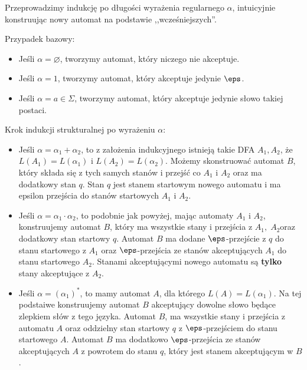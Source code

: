     Przeprowadzimy indukcję po długości wyrażenia regularnego \(\alpha\), intuicyjnie konstruując nowy automat na podstawie ,,wcześniejszych''.
    
    Przypadek bazowy:
    \begin{itemize}
        \item Jeśli \( \alpha = \varnothing \), tworzymy automat, który niczego nie akceptuje.
        \item Jeśli \( \alpha = 1 \), tworzymy automat, który akceptuje jedynie \(\eps\).
        \item Jeśli \( \alpha = a \in \Sigma \), tworzymy automat, który akceptuje jedynie słowo takiej postaci.
    \end{itemize}
    
    Krok indukcji strukturalnej po wyrażeniu \(\alpha\): 
    \begin{itemize}
        \item Jeśli \( \alpha = \alpha_1 + \alpha_2 \), to z założenia indukcyjnego istnieją takie DFA \(A_1, A_2\), że \(L(A_1) = L(\alpha_1)\) i \(L(A_2) = L(\alpha_2)\).
        Możemy skonstruować automat \(B\), który składa się z tych samych stanów i przejść co \(A_1\) i \(A_2\) oraz ma dodatkowy stan \(q\).
        Stan \(q\) jest stanem startowym nowego automatu i ma epsilon przejścia do stanów startowych \(A_1\) i \(A_2\).
        \item Jeśli \( \alpha = \alpha_1 \cdot \alpha_2 \), to podobnie jak powyżej, mając automaty \(A_1\) i \(A_2\), konstruujemy automat \(B\), który ma wszystkie stany i przejścia z \(A_1,\;A_2\)oraz dodatkowy stan startowy \(q\).
        Automat \(B\) ma dodane \(\eps\)-przejście z \(q\) do stanu startowego z \(A_1\) oraz \(\eps\)-przejścia ze stanów akceptujących \(A_1\) do stanu startowego \(A_2\). Stanami akceptującymi nowego automatu są \textbf{tylko} stany akceptujące z \(A_2\).
        \item Jeśli \( \alpha = (\alpha_1)^{*}\), to mamy automat \(A\), dla którego \(L(A) = L(\alpha_1)\). Na tej podstaiwe konstruujemy automat \(B\) akceptujący dowolne słowo będące zlepkiem słów z tego języka.
        Automat \(B\), ma wszystkie stany i przejścia z automatu \(A\) oraz oddzielny stan startowy \(q\) z \(\eps\)-przejściem do stanu startowego \(A\).
        Automat \(B\) ma dodatkowo \(\eps\)-przejścia ze stanów akceptujących \(A\) z powrotem do stanu \(q\), który jest stanem akceptującym w \(B\).
    \end{itemize}